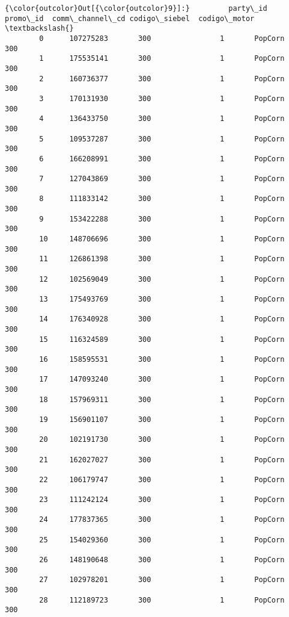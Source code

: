 \documentclass[11pt]{article}
\begin{document}
\begin{Verbatim}[commandchars=\\\{\}]
{\color{outcolor}Out[{\color{outcolor}9}]:}         party\_id  promo\_id  comm\_channel\_cd codigo\_siebel  codigo\_motor  \textbackslash{}
        0      107275283       300                1       PopCorn           300   
        1      175535141       300                1       PopCorn           300   
        2      160736377       300                1       PopCorn           300   
        3      170131930       300                1       PopCorn           300   
        4      136433750       300                1       PopCorn           300   
        5      109537287       300                1       PopCorn           300   
        6      166208991       300                1       PopCorn           300   
        7      127043869       300                1       PopCorn           300   
        8      111833142       300                1       PopCorn           300   
        9      153422288       300                1       PopCorn           300   
        10     148706696       300                1       PopCorn           300   
        11     126861398       300                1       PopCorn           300   
        12     102569049       300                1       PopCorn           300   
        13     175493769       300                1       PopCorn           300   
        14     176340928       300                1       PopCorn           300   
        15     116324589       300                1       PopCorn           300   
        16     158595531       300                1       PopCorn           300   
        17     147093240       300                1       PopCorn           300   
        18     157969311       300                1       PopCorn           300   
        19     156901107       300                1       PopCorn           300   
        20     102191730       300                1       PopCorn           300   
        21     162027027       300                1       PopCorn           300   
        22     106179747       300                1       PopCorn           300   
        23     111242124       300                1       PopCorn           300   
        24     177837365       300                1       PopCorn           300   
        25     154029360       300                1       PopCorn           300   
        26     148190648       300                1       PopCorn           300   
        27     102978201       300                1       PopCorn           300   
        28     112189723       300                1       PopCorn           300   

\end{Verbatim}
\end{document}
